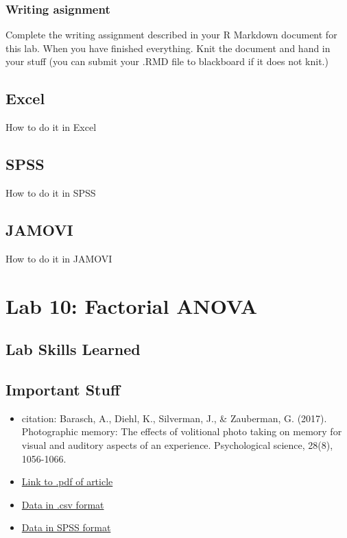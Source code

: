 \documentclass[]{book}
\providecommand{\tightlist}{%
  \setlength{\itemsep}{0pt}\setlength{\parskip}{0pt}}
\theoremstyle{definition}
\theoremstyle{definition}
\theoremstyle{definition}
\theoremstyle{remark}
\begin{document}
\subsection{Writing asignment}\label{writing-asignment-6}

Complete the writing assignment described in your R Markdown document
for this lab. When you have finished everything. Knit the document and
hand in your stuff (you can submit your .RMD file to blackboard if it
does not knit.)

\section{Excel}\label{excel-8}

How to do it in Excel

\section{SPSS}\label{spss-8}

How to do it in SPSS

\section{JAMOVI}\label{jamovi-8}

How to do it in JAMOVI

\chapter{Lab 10: Factorial ANOVA}\label{lab-10-factorial-anova}

\section{Lab Skills Learned}\label{lab-skills-learned-4}

\section{Important Stuff}\label{important-stuff-4}

\begin{itemize}
\tightlist
\item
  citation: Barasch, A., Diehl, K., Silverman, J., \& Zauberman, G.
  (2017). Photographic memory: The effects of volitional photo taking on
  memory for visual and auditory aspects of an experience. Psychological
  science, 28(8), 1056-1066.
\item
  \href{http://journals.sagepub.com/doi/abs/10.1177/0956797617694868}{Link
  to .pdf of article}
\item
  \href{}{Data in .csv format}
\item
  \href{}{Data in SPSS format}
\end{itemize}
\end{document}
